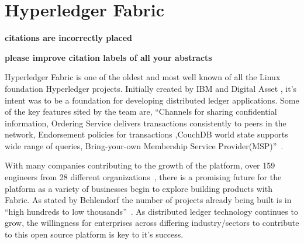 \section{Hyperledger Fabric}

{\bf citations are incorrectly placed}

{\bf please improve citation labels of all your abstracts}

Hyperledger Fabric is one of the oldest and most well known of all the
Linux foundation Hyperledger projects. Initially created by IBM and
Digital Asset , it’s intent was to be a foundation for developing
distributed ledger applications. Some of the key features sited by the
team are, ``Channels for sharing confidential information, Ordering
Service delivers transactions consistently to peers in the network,
Endorsement policies for transactions ,CouchDB world state supports
wide range of queries, Bring-your-own Membership Service
Provider(MSP)''~\cite{Hyperledger Fabric}.

With many companies contributing to the growth of the platform, over
159 engineers from 28 different organizations~\cite{Behlendorf
  Interview}, there is a promising future for the platform as a
variety of businesses begin to explore building products with
Fabric. As stated by Behlendorf the number of projects already being
built is in 
``high hundreds to low thousands''~\cite{Behlendorf Interview}. 
As distributed ledger technology continues to grow, the
willingness for enterprises across differing industry/sectors to
contribute to this open source platform is key to it's success.

